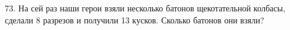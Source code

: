73. На сей раз наши герои взяли несколько батонов щекотательной колбасы, сделали 8 разрезов и получили 13 кусков. Сколько батонов они взяли?\\
